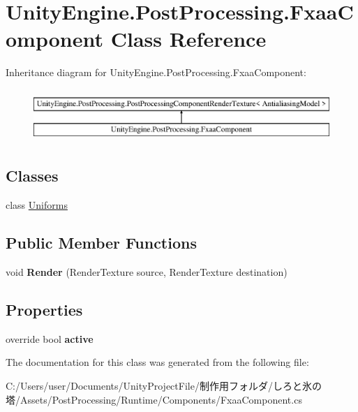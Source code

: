 \hypertarget{class_unity_engine_1_1_post_processing_1_1_fxaa_component}{}\section{Unity\+Engine.\+Post\+Processing.\+Fxaa\+Component Class Reference}
\label{class_unity_engine_1_1_post_processing_1_1_fxaa_component}
Inheritance diagram for Unity\+Engine.\+Post\+Processing.\+Fxaa\+Component\+:\begin{figure}[H]
\begin{center}
\leavevmode
\includegraphics[height=2.000000cm]{class_unity_engine_1_1_post_processing_1_1_fxaa_component}
\end{center}
\end{figure}
\subsection*{Classes}
\begin{DoxyCompactItemize}
\item 
class \hyperlink{class_unity_engine_1_1_post_processing_1_1_fxaa_component_1_1_uniforms}{Uniforms}
\end{DoxyCompactItemize}
\subsection*{Public Member Functions}
\begin{DoxyCompactItemize}
\item 
\mbox{\label{class_unity_engine_1_1_post_processing_1_1_fxaa_component_a6525bbafd720828046143061fa322d9a}} 
void {\bfseries Render} (Render\+Texture source, Render\+Texture destination)
\end{DoxyCompactItemize}
\subsection*{Properties}
\begin{DoxyCompactItemize}
\item 
\mbox{\label{class_unity_engine_1_1_post_processing_1_1_fxaa_component_a957e4d3dd96f10cfb3668b391a188d43}} 
override bool {\bfseries active}
\end{DoxyCompactItemize}


The documentation for this class was generated from the following file\+:\begin{DoxyCompactItemize}
\item 
C\+:/\+Users/user/\+Documents/\+Unity\+Project\+File/制作用フォルダ/しろと氷の塔/\+Assets/\+Post\+Processing/\+Runtime/\+Components/Fxaa\+Component.\+cs\end{DoxyCompactItemize}
